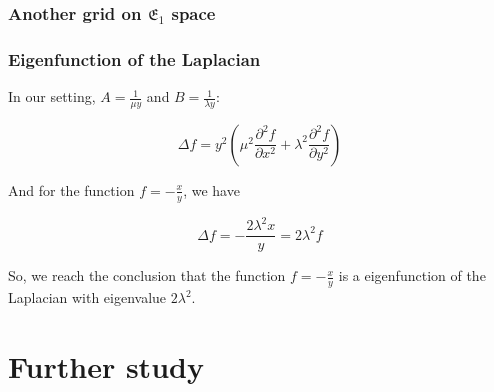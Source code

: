 \documentclass[aspectratio=169]{beamer}
\begin{document}
\begin{frame}
    \frametitle{Another grid on $\mathfrak{E}_1$ space}
    \begin{figure}[ht]\centering
    \end{figure}
\end{frame}

\begin{frame}
    \frametitle{Eigenfunction of the Laplacian}
    In our setting, \(A = \frac{1}{\mu y}\) and \(B = \frac{1}{\lambda y}\):

    \[
        \Delta f = y^2 \left(\mu^2 \frac{\partial^2 f}{\partial x^2} + \lambda^2 \frac{\partial^2 f}{\partial y^2}\right)
    \]

    And for the function \(f = - \frac{x}{y}\), we have

    \[
        \Delta f = - \frac{2 \lambda^2 x}{y} = 2 \lambda^2 f
    \]

    So, we reach the conclusion that the function \(f = - \frac{x}{y}\) is a eigenfunction of the Laplacian with eigenvalue \(2 \lambda^2\).\end{frame}
\section{Further study}
\end{document}
